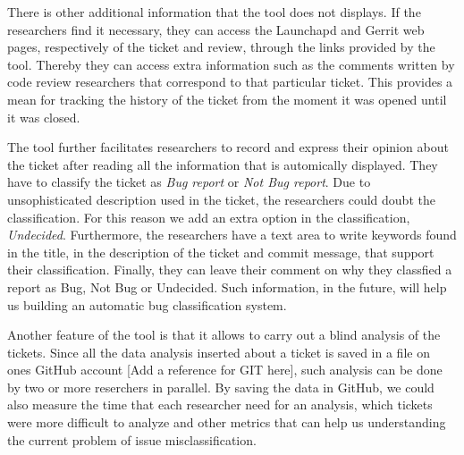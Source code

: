 \documentclass[runningheads,a4paper]{llncs}
\begin{document}
There is other additional information that the tool does not displays. If the researchers find it necessary, they can access the Launchapd and Gerrit web pages, respectively of the ticket and review, through the links provided by the tool. Thereby they can access extra information such as the comments written by code review researchers that correspond to that particular ticket. This provides a mean for tracking the history of the ticket from the moment it was opened until it was closed.

The tool further facilitates researchers to record and express their opinion about the ticket after reading all the information that is automically displayed. They have to classify the ticket as \textit{Bug report} or \textit{Not Bug report}. Due to unsophisticated description used in the ticket, the researchers could doubt the classification. For this reason we add an extra option in the classification, \textit{Undecided}. Furthermore, the researchers have a text area to write keywords found in the title, in the description of the ticket and commit message, that support their classification.
Finally, they can leave their comment on why they classfied a report as Bug, Not Bug or Undecided. Such information, in the future, will help us building an automatic bug classification system.

Another feature of the tool is that it allows to carry out a blind analysis of the tickets. Since all the data analysis inserted about a ticket is saved in a file on ones GitHub account [Add a reference for GIT here], such analysis can be done by two or more reserchers in parallel. By saving the data in GitHub, we could also measure the time that each researcher need for an analysis, which tickets were more difficult to analyze and other metrics that can help us understanding the current problem of issue misclassification.
\end{document}
